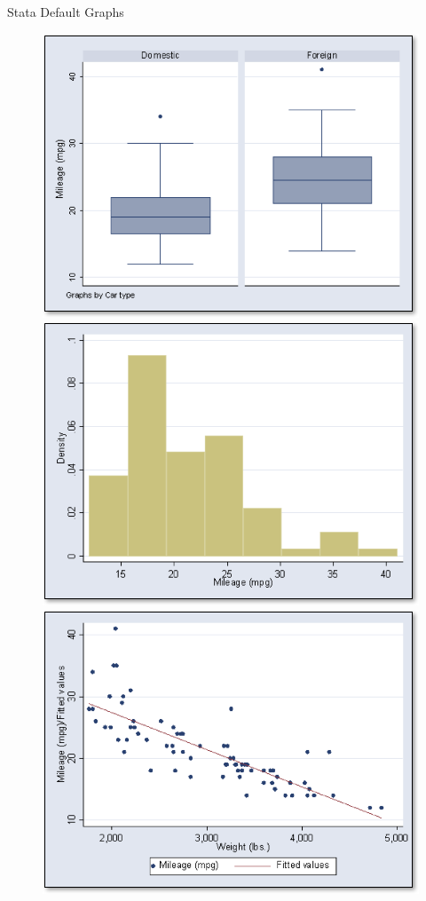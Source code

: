 \documentclass[aspectratio=169]{beamer}
\begin{document}
\begin{frame}{Stata Default Graphs}
	\begin{figure}
		\centering
		\includegraphics[width= 2 in]{img/boxplot2}
		\includegraphics[width= 2 in]{img/histogram1}
		\includegraphics[width= 2 in]{img/scatter1}
	\end{figure}
\end{frame}
\end{document}
